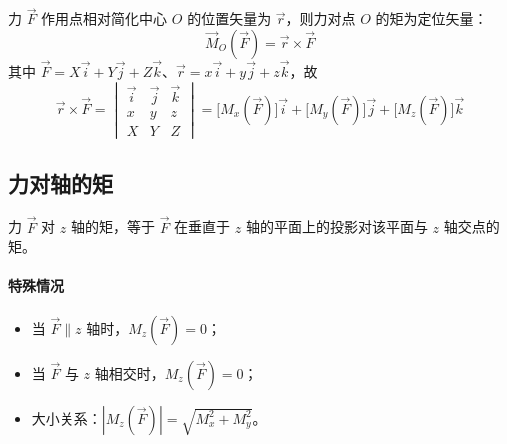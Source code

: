 力 $\vec{F}$ 作用点相对简化中心 $O$ 的位置矢量为 $\vec{r}$，则力对点 $O$ 的矩为定位矢量：
\begin{equation}
\boxed{\;\vec{M}_O(\vec{F})=\vec{r}\times\vec{F}\;}
\label{eq:3-力矩-定义}
\end{equation}
其中 $\vec{F}=X\vec{i}+Y\vec{j}+Z\vec{k}$、$\vec{r}=x\vec{i}+y\vec{j}+z\vec{k}$，故
\begin{equation}
\vec{r}\times\vec{F}=
\begin{vmatrix}\vec{i}&\vec{j}&\vec{k}\\ x&y&z\\ X&Y&Z\end{vmatrix}
=\big[M_x(\vec{F})\big]\vec{i}+\big[M_y(\vec{F})\big]\vec{j}+\big[M_z(\vec{F})\big]\vec{k}
\label{eq:3-力矩-行列式}
\end{equation}

\subsection{力对轴的矩}

 力 $\vec{F}$ 对 $z$ 轴的矩，等于 $\vec{F}$ 在垂直于 $z$ 轴的平面上的投影对该平面与 $z$ 轴交点的矩。

\paragraph{特殊情况}
\begin{itemize}
\item 当 $\vec{F}\parallel z$ 轴时，$M_z(\vec{F})=0$；
\item 当 $\vec{F}$ 与 $z$ 轴相交时，$M_z(\vec{F})=0$；
\item 大小关系：$|M_z(\vec{F})|=\sqrt{M_x^2+M_y^2}$。
\end{itemize}


